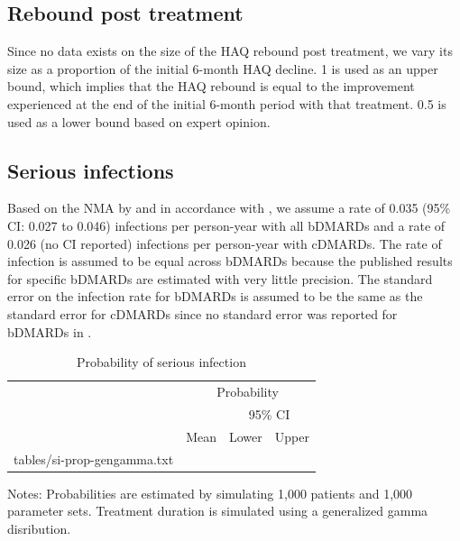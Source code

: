 \documentclass[11pt,final,fleqn]{article}\usepackage[]{graphicx}\usepackage[]{color}
\makeatletter
\theoremstyle{plain}
\newcommand*\ExpandableInput[1]{\@@input#1 }
\makeatother
\begin{document}
\subsection{Rebound post treatment}
Since no data exists on the size of the HAQ rebound post treatment, we vary its size as a proportion of the initial 6-month HAQ decline. 1 is used as an upper bound, which implies that the HAQ rebound is equal to the improvement experienced at the end of the initial 6-month period with that treatment. 0.5 is used as a lower bound based on expert opinion.

\subsection{Serious infections}
Based on the NMA by \citet{singh2011adverse} and in accordance with \citet{stevenson2016adalimumab}, we assume a rate of 0.035 (95\% CI: 0.027 to 0.046) infections per person-year with all bDMARDs and a rate of 0.026 (no CI reported) infections per person-year with cDMARDs. The rate of infection is assumed to be equal across bDMARDs because the published results for specific bDMARDs are estimated with very little precision. The standard error on the infection rate for bDMARDs is assumed to be the same as the standard error for cDMARDs since no standard error was reported for bDMARDs in \citet{singh2011adverse}.



\begin{table}[!ht]
\begin{center}
\begin{threeparttable}
\caption{Probability of serious infection} \label{tbl:si-prob}
\begin{tabularx}{\textwidth}{@{\extracolsep{\fill}}lrrr}
\hline
\multicolumn{1}{l}{} & \multicolumn{3}{c}{Probability} \\
\cmidrule{2-4} 
\multicolumn{2}{l}{} & \multicolumn{2}{c}{95\% CI} \\
\cmidrule{3-4} 
\multicolumn{1}{c}{} & \multicolumn{1}{c}{Mean} & \multicolumn{1}{c}{Lower} & \multicolumn{1}{c}{Upper} \\
\hline
\ExpandableInput{tables/si-prop-gengamma.txt}
\hline
\end{tabularx}
\scriptsize
Notes: Probabilities are estimated by simulating 1,000 patients and 1,000 parameter sets. Treatment duration is simulated using a generalized gamma disribution. 
\end{threeparttable}
\end{center}
\end{table}
\end{document}
